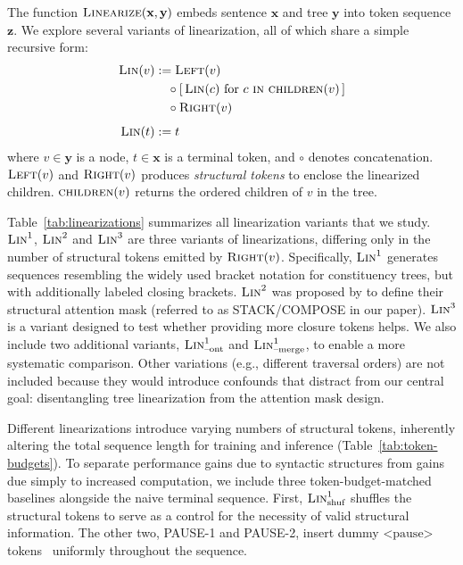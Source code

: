 \documentclass[11pt]{article}
\begin{document}
The function $\textsc{Linearize}(\mathbf{x}, \mathbf{y})$ embeds sentence $\mathbf{x}$ and tree $\mathbf{y}$ into token sequence $\mathbf{z}$. We explore several variants of linearization, all of which share a simple recursive form:
\begin{align}
    \textsc{Lin}(v) &:= \textsc{Left}(v) \notag \\
    &\quad \circ [\, \textsc{Lin}(c) \text{ for } c ~\textsc{in} ~\textsc{children}(v) \,] \notag \\ 
    &\quad \circ \textsc{Right}(v) \\[1ex]
    \textsc{Lin}(t) &:= t
\end{align}
where $v\in \mathbf{y}$ is a node, $t\in\mathbf{x}$ is a terminal token, and $\circ$ denotes concatenation. $\textsc{Left}(v)$ and $\textsc{Right}(v)$ produces \emph{structural tokens} to enclose the linearized children. $\textsc{children}(v)$ returns the ordered children of $v$ in the tree. 

Table~\ref{tab:linearizations} summarizes all linearization variants that we study. $\textsc{Lin}^1$, $\textsc{Lin}^2$ and $\textsc{Lin}^3$ are three variants of linearizations, differing only in the number of structural tokens emitted by $\textsc{Right}(v)$. Specifically, $\textsc{Lin}^1$ generates sequences resembling the widely used bracket notation for constituency trees, but with additionally labeled closing brackets. $\textsc{Lin}^2$ was proposed by \citet{sartran-etal-2022-transformer} to define their structural attention mask (referred to as STACK/COMPOSE in our paper). $\textsc{Lin}^3$ is a variant designed to test whether providing more closure tokens helps. We also include two additional variants, $\textsc{Lin}^1_{\text{--ont}}$ and $\textsc{Lin}^1_{\text{--merge}}$, to enable a more systematic comparison. %
Other variations (e.g., different traversal orders) are not included because they would introduce confounds that distract from our central goal: disentangling tree linearization from the attention mask design. %

Different linearizations introduce varying numbers of structural tokens, inherently altering the total sequence length for training and inference (Table~\ref{tab:token-budgets}). %
To separate performance gains due to syntactic structures from gains due simply to increased computation, we include three token-budget-matched baselines alongside the naive terminal sequence. First, $\textsc{Lin}^1_{\text{shuf}}$ shuffles the structural tokens to serve as a control for the necessity of valid structural information. The other two, PAUSE-1 and PAUSE-2, insert dummy $\text{<pause>}$ tokens~\cite{goyal2024think} uniformly throughout the sequence.
\end{document}
